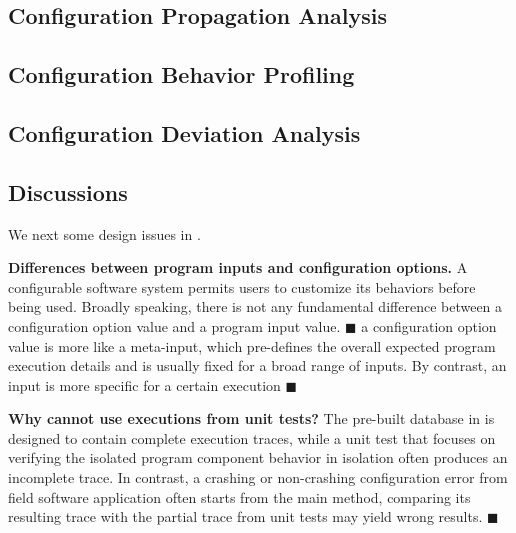 \subsection{Configuration Propagation Analysis}
\label{sec:prop}


\subsection{Configuration Behavior Profiling}
\label{sec:profiling}



\subsection{Configuration Deviation Analysis}
\label{sec:analysis}



\subsection{Discussions}

We next some design issues in \ourtool.

\vspace{1mm}
\noindent \textbf{Differences between program inputs and configuration options.}
A configurable software system permits users to
customize its behaviors before being used. Broadly speaking,
there is not any fundamental difference between a configuration option
value and a program input value. $\blacksquare$ a configuration option
value is more like a meta-input, which pre-defines the overall expected program
execution details and is usually fixed for a broad range of inputs.
By contrast, an input is more specific for a certain execution $\blacksquare$


\vspace{1mm}
\noindent \textbf{Why cannot use executions from unit tests?}
The pre-built database in \ourtool is designed to contain complete
execution traces, while a unit test that focuses on verifying the
isolated program component behavior in isolation often produces
an incomplete trace. In contrast, a crashing or non-crashing configuration
error from field software application often starts from the main method,
comparing its resulting trace with the partial trace from unit tests
may yield wrong results. $\blacksquare$



